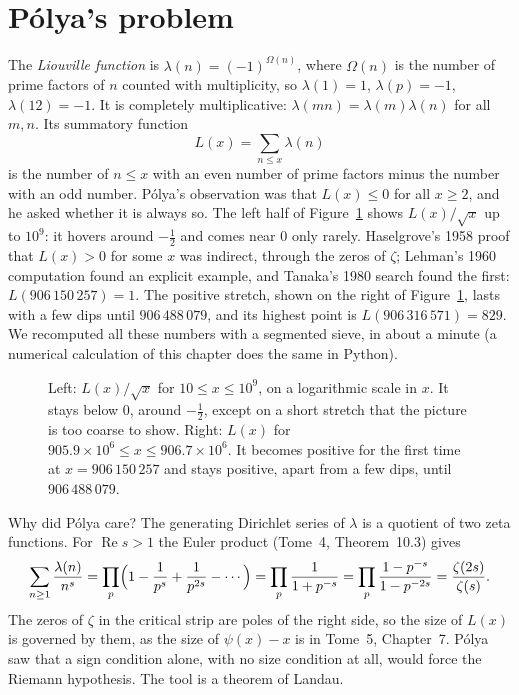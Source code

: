 \section{P\'olya's problem}

The \emph{Liouville function} is $\lambda(n)=(-1)^{\Omega(n)}$, where $\Omega(n)$ is the number of prime factors of $n$ counted with multiplicity, so
$\lambda(1)=1$, $\lambda(p)=-1$, $\lambda(12)=-1$. It is completely multiplicative: $\lambda(mn)=\lambda(m)\lambda(n)$ for all $m,n$. Its summatory function
\[
L(x)=\sum_{n\le x}\lambda(n)
\]
is the number of $n\le x$ with an even number of prime factors minus the number with an odd number. P\'olya's observation was that $L(x)\le0$ for all $x\ge2$, and
he asked whether it is always so. The left half of Figure~\ref{conjectures:fig:liouville} shows $L(x)/\sqrt x$ up to $10^9$: it hovers around $-\frac12$ and comes near $0$
only rarely. Haselgrove's 1958 proof that $L(x)>0$ for some $x$ was indirect, through the zeros of $\zeta$; Lehman's 1960 computation found an explicit example,
and Tanaka's 1980 search found the first: $L(906\,150\,257)=1$. The positive stretch, shown on the right of Figure~\ref{conjectures:fig:liouville}, lasts with a few dips
until $906\,488\,079$, and its highest point is $L(906\,316\,571)=829$. We recomputed all these numbers with a segmented sieve, in about a minute (a numerical calculation
of this chapter does the same in Python).

\begin{figure}[ht]
\centering
{}
\caption{Left: $L(x)/\sqrt x$ for $10\le x\le10^9$, on a logarithmic scale in $x$. It stays below $0$, around $-\frac12$, except on a short stretch that the
picture is too coarse to show. Right: $L(x)$ for $905.9\times10^6\le x\le906.7\times10^6$. It becomes positive for the first time at $x=906\,150\,257$ and
stays positive, apart from a few dips, until $906\,488\,079$.}
\label{conjectures:fig:liouville}
\end{figure}

Why did P\'olya care? The generating Dirichlet series of $\lambda$ is a quotient of two zeta functions. For $\operatorname{Re}s>1$ the Euler product
(Tome~4, Theorem~10.3) gives
\[
\sum_{n\ge1}\frac{\lambda(n)}{n^s}=\prod_p\Bigl(1-\frac1{p^s}+\frac1{p^{2s}}-\cdots\Bigr)=\prod_p\frac1{1+p^{-s}}=\prod_p\frac{1-p^{-s}}{1-p^{-2s}}=\frac{\zeta(2s)}{\zeta(s)}.
\]
The zeros of $\zeta$ in the critical strip are poles of the right side, so the size of $L(x)$ is governed by them, as the size of $\psi(x)-x$ is in Tome~5,
Chapter~7. P\'olya saw that a sign condition alone, with no size condition at all, would force the Riemann hypothesis. The tool is a theorem of Landau.


